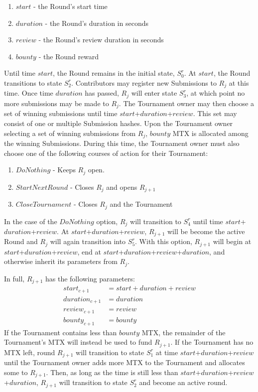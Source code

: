 \documentclass[a4paper, 10pt, conference]{ieeeconf}      %
\begin{document}
\begin{enumerate}
    \item $start$ - the Round's start time
    \item $duration$ - the Round's duration in seconds
    \item $review$ - the Round's review duration in seconds
    \item $bounty$ - the Round reward
\end{enumerate}
Until time $start$, the Round remains in the initial state, $S_{0}^r$. At $start$, the Round transitions to state $S_{2}^r$. Contributors may register new Submissions to $R_j$ at this time.
Once time $duration$ has passed, $R_j$ will enter state $S_{3}^r$, at which point no more submissions may be made to $R_j$. The Tournament owner may then choose a set of winning submissions until time $start$+$duration$+$review$. This set may consist of one or multiple Submission hashes.
Upon the Tournament owner selecting a set of winning submissions from $R_j$, $bounty$ MTX is allocated among the winning Submissions. During this time, the Tournament owner must also choose one of the following courses of action for their Tournament:
\begin{enumerate}
\item $DoNothing$ - Keeps $R_j$ open. 
\item $StartNextRound$ - Closes $R_j$ and opens $R_{j+1}$
\item $CloseTournament$ - Closes $R_j$ and the Tournament
\end{enumerate}

In the case of the $DoNothing$ option, $R_j$ will transition to $S_{4}^r$ until time $start$+$duration$+$review$. At $start$+$duration$+$review$, $R_{j+1}$ will be become the active Round and $R_j$ will again transition into $S_{5}^r$. With this option, $R_{j+1}$ will begin at $start$+$duration$+$review$, end at $start$+$duration$+$review$+$duration$, and otherwise inherit its parameters from $R_j$.

In full, $R_{j+1}$ has the following parameters:
\begin{align*}
start_{c+1} &=  start + duration + review \\
duration_{c+1} &= duration \\
review_{c+1} &= review \\
bounty_{c+1} &= bounty
\end{align*}
If the Tournament contains less than $bounty$ MTX, the remainder of the Tournament's MTX will instead be used to fund $R_{j+1}$. If the Tournament has no MTX left, round $R_{j+1}$ will transition to state $S_{1}^r$ at time $start$+$duration$+$review$ until the Tournament owner adds more MTX to the Tournament and allocates some to $R_{j+1}$. Then, as long as the time is still less than $start$+$duration$+$review$+$duration$, $R_{j+1}$ will transition to state $S_{2}^r$ and become an active round.
\end{document}
